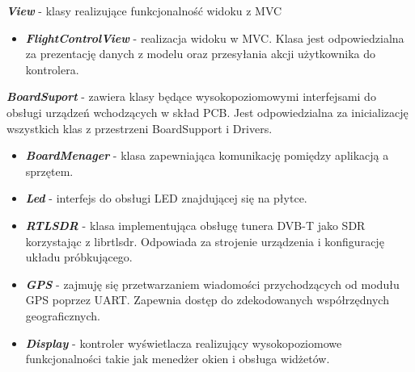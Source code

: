\documentclass[eng,printmode]{mgr}
\begin{document}
\noindent
\textbf{\textit{View}} - klasy realizujące funkcjonalność widoku z MVC
\begin{itemize}[label={}]
  \item \textbf{\textit{FlightControlView}} - realizacja widoku w MVC. Klasa jest odpowiedzialna za prezentację danych z modelu oraz przesyłania akcji użytkownika do kontrolera.
\end{itemize}
\vskip 0.55cm

\noindent
\textbf{\textit{BoardSuport}} - zawiera klasy będące wysokopoziomowymi interfejsami do obsługi urządzeń wchodzących w skład PCB. Jest odpowiedzialna za inicializację wszystkich klas z przestrzeni BoardSupport i Drivers.
\begin{itemize}[label={}]
  \item \textbf{\textit{BoardMenager}} - klasa zapewniająca komunikację pomiędzy aplikacją a sprzętem.
  \item \textbf{\textit{Led}} - interfejs do obsługi LED znajdującej się na płytce.
  \item \textbf{\textit{RTLSDR}} - klasa implementująca obsługę tunera DVB-T jako SDR korzystając z librtlsdr. Odpowiada za strojenie urządzenia i konfigurację układu próbkującego. 
  \item \textbf{\textit{GPS}} - zajmuję się przetwarzaniem wiadomości przychodzących od modułu GPS poprzez UART. Zapewnia dostęp do zdekodowanych współrzędnych geograficznych.
  \item \textbf{\textit{Display}} - kontroler wyświetlacza realizujący wysokopoziomowe funkcjonalności takie jak menedżer okien i obsługa widżetów.
\end{itemize}
\vskip 0.55cm
\end{document}
